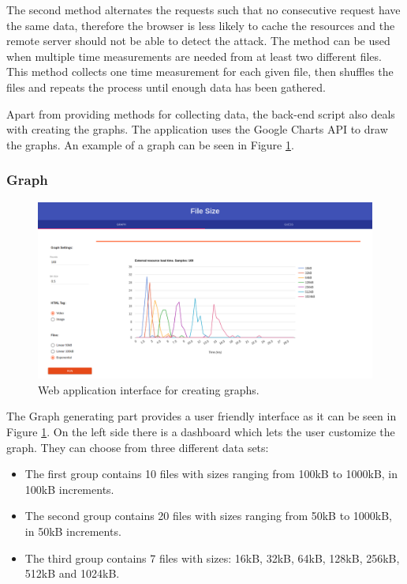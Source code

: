 \documentclass[10pt,a4paper,twoside]{book}
\begin{document}
The second method alternates the requests such that no consecutive request have the same data, therefore the browser is less likely to cache the resources and the remote server should not be able to detect the attack. The method can be used when multiple time measurements are needed from at least two different files. This method collects one time measurement for each given file, then shuffles the files and repeats the process until enough data has been gathered. 

Apart from providing methods for collecting data, the back-end script also deals with creating the graphs. The application uses the Google Charts API to draw the graphs. An example of a graph can be seen in Figure \ref{fig:videointerface}.


\subsubsection{Graph}

\begin{figure}[h]
\centering
\includegraphics[width=\textwidth]{figures/interface.png}
\caption{Web application interface for creating graphs.}
\label{fig:videointerface}
\end{figure}

The Graph generating part provides a user friendly interface as it can be seen in Figure \ref{fig:videointerface}. On the left side there is a dashboard which lets the user customize the graph. They can choose from three different data sets:
\begin{itemize}
\item The first group contains 10 files with sizes ranging from 100kB to 1000kB, in 100kB increments.
\item The second group contains 20 files with sizes ranging from 50kB to 1000kB, in 50kB increments.
\item The third group contains 7 files with sizes: 16kB, 32kB, 64kB, 128kB, 256kB, 512kB and 1024kB.
\end{itemize}
\end{document}
